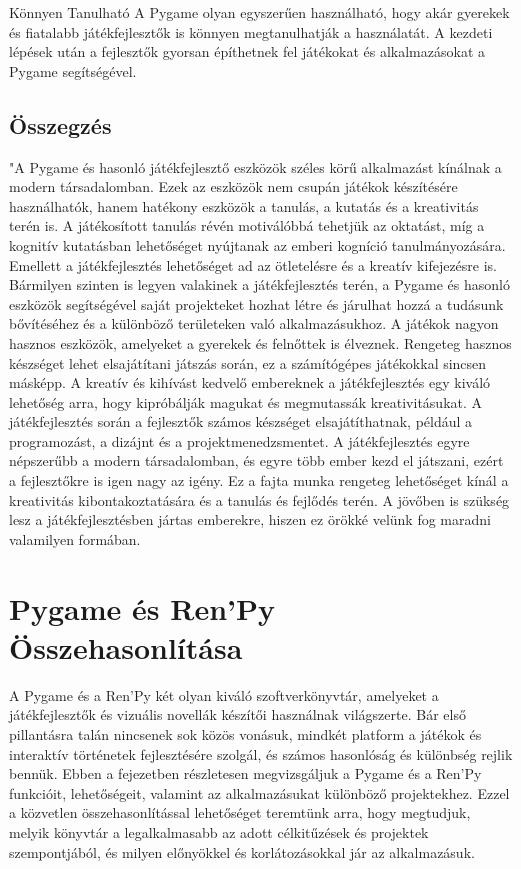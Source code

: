 Könnyen Tanulható
A Pygame olyan egyszerűen használható, hogy akár gyerekek és fiatalabb játékfejlesztők is könnyen megtanulhatják a használatát. A kezdeti lépések után a fejlesztők gyorsan építhetnek fel játékokat és alkalmazásokat a Pygame segítségével.


\subsection{Összegzés}
"A Pygame és hasonló játékfejlesztő eszközök széles körű alkalmazást kínálnak a modern társadalomban. Ezek az eszközök nem csupán játékok készítésére használhatók, hanem hatékony eszközök a tanulás, a kutatás és a kreativitás terén is. A játékosított tanulás révén motiválóbbá tehetjük az oktatást, míg a kognitív kutatásban lehetőséget nyújtanak az emberi kogníció tanulmányozására. Emellett a játékfejlesztés lehetőséget ad az ötletelésre és a kreatív kifejezésre is. Bármilyen szinten is legyen valakinek a játékfejlesztés terén, a Pygame és hasonló eszközök segítségével saját projekteket hozhat létre és járulhat hozzá a tudásunk bővítéséhez és a különböző területeken való alkalmazásukhoz. A játékok nagyon hasznos eszközök, amelyeket a gyerekek és felnőttek is élveznek. Rengeteg hasznos készséget lehet elsajátítani játszás során, ez a számítógépes játékokkal sincsen másképp. A kreatív és kihívást kedvelő embereknek a játékfejlesztés egy kiváló lehetőség arra, hogy kipróbálják magukat és megmutassák kreativitásukat. A játékfejlesztés során a fejlesztők számos készséget elsajátíthatnak, például a programozást, a dizájnt és a projektmenedzsmentet. A játékfejlesztés egyre népszerűbb a modern társadalomban, és egyre több ember kezd el játszani, ezért a fejlesztőkre is igen nagy az igény. Ez a fajta munka rengeteg lehetőséget kínál a kreativitás kibontakoztatására és a tanulás és fejlődés terén. A jövőben is szükség lesz a játékfejlesztésben jártas emberekre, hiszen ez örökké velünk fog maradni valamilyen formában.


\section{Pygame és Ren'Py Összehasonlítása}
A Pygame és a Ren'Py két olyan kiváló szoftverkönyvtár, amelyeket a játékfejlesztők és vizuális novellák készítői használnak világszerte. Bár első pillantásra talán nincsenek sok közös vonásuk, mindkét platform a játékok és interaktív történetek fejlesztésére szolgál, és számos hasonlóság és különbség rejlik bennük. Ebben a fejezetben részletesen megvizsgáljuk a Pygame és a Ren'Py funkcióit, lehetőségeit, valamint az alkalmazásukat különböző projektekhez. Ezzel a közvetlen összehasonlítással lehetőséget teremtünk arra, hogy megtudjuk, melyik könyvtár a legalkalmasabb az adott célkitűzések és projektek szempontjából, és milyen előnyökkel és korlátozásokkal jár az alkalmazásuk.

